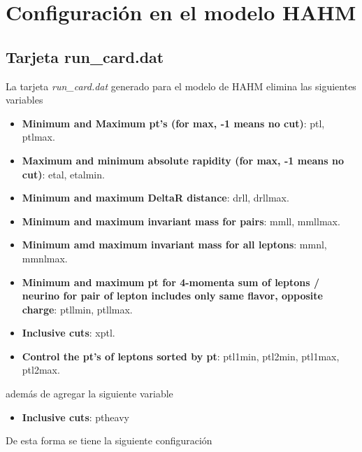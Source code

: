 \section{Configuración en el modelo HAHM}
    \subsection{Tarjeta run\_card.dat}
    La tarjeta \textit{run\_card.dat} generado para el modelo de HAHM elimina las siguientes variables
    \begin{itemize}
        \item \textbf{Minimum and Maximum pt's (for max, -1 means no cut)}: ptl, ptlmax.
        \item \textbf{Maximum and minimum absolute rapidity (for max, -1 means no cut)}: etal, etalmin.
        \item \textbf{Minimum and maximum DeltaR distance}: drll, drllmax.
        \item \textbf{Minimum and maximum invariant mass for pairs}: mmll, mmllmax.
        \item \textbf{Minimum amd maximum invariant mass for all leptons}: mmnl, mmnlmax.
        \item \textbf{Minimum and maximum pt for 4-momenta sum of leptons / neurino for pair of lepton includes only same flavor, opposite charge}: ptllmin, ptllmax.
        \item \textbf{Inclusive cuts}: xptl.
        \item \textbf{Control the pt's of leptons sorted by pt}: ptl1min, ptl2min, ptl1max, ptl2max. 
    \end{itemize}
    además de agregar la siguiente variable
    \begin{itemize}
        \item \textbf{Inclusive cuts}: ptheavy
    \end{itemize}
    De esta forma se tiene la siguiente configuración
